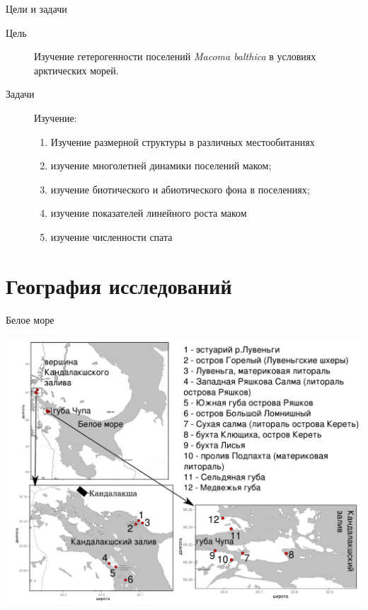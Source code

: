 \documentclass{beamer}
\begin{document}
\begin{frame}{Цели и задачи}
\begin{description}
	\item[Цель] Изучение гетерогенности поселений {\it Macoma balthica} в условиях арктических морей.

	\item[Задачи]  Изучение:
		\begin{enumerate}
    \item Изучение размерной структуры в различных местообитаниях %
      \pause
    \item изучение многолетней динамики поселений маком;
      \pause
    \item изучение биотического и абиотического фона в поселениях;
      \pause
    \item изучение показателей линейного роста маком%
      \pause
    \item изучение численности спата %
		  \end{enumerate}
\end{description}
\end{frame}


		\section[География]{География исследований}
\begin{frame}{Белое море}
 \begin{center}
	\includegraphics[height=.8\textheight]{./White_sea.pdf}
 \end{center}
\end{frame}
\end{document}
